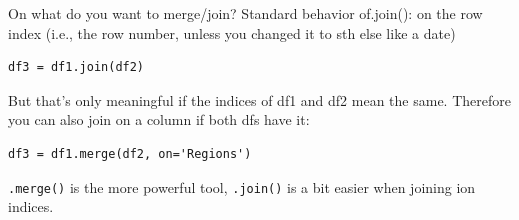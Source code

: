 \documentclass{beamer}
\begin{document}
{
	\begin{frame}[plain]
\end{frame}
	\begin{frame}[plain]
\end{frame}
}

\begin{frame}[fragile]{On what do you want to merge/join?}
Standard behavior of.join(): on the row index  (i.e., the row number, unless
you changed it to sth else like a date)
\begin{lstlisting}
df3 = df1.join(df2)
\end{lstlisting}
\pause
But that’s only meaningful if the indices of df1 and df2 mean the same. Therefore you can also join on a column if both dfs have it:
\begin{lstlisting}
df3 = df1.merge(df2, on='Regions')
\end{lstlisting}
\pause
\texttt{.merge()} is the more powerful tool, \texttt{.join()} is a bit easier when joining ion indices.
\end{frame}
\end{document}
